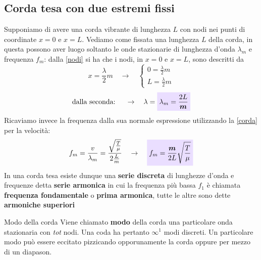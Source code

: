 \documentclass[x11names]{report}
\newcommand{\viola}[1]{\colorbox{yred}{$\displaystyle #1$}}
\begin{document}
		\subsection{Corda tesa con due estremi fissi}
		Supponiamo di avere una corda vibrante di lunghezza \(L\) con nodi nei punti di coordinate \(x=0\) e \(x=L\). Vediamo come fissata una lunghezza \(L\) della corda, in questa possono aver luogo soltanto le onde stazionarie di lunghezza d'onda \(\lambda_m\) e frequenza \(f_m\): dalla \ref{nodi} si ha che i nodi, in \(x=0\) e \(x=L\), sono descritti da
		\[ 
		x = \frac{\lambda}{2}m \quad \rightarrow \quad \begin{cases}
			0 = \frac{\lambda}{2}m\\ L = \frac{\lambda}{2}m
		\end{cases}
		\]
		\begin{equation}\label{lambdam}
			\text{dalla seconda: }\quad \to \quad \lambda = \viola{\lambda_m = \frac{2L}{\boldsymbol{m}}}
		\end{equation}
		Ricaviamo invece la frequenza dalla sua normale espressione utilizzando la \ref{corda} per la velocità:
		\[ 
		f_m = \frac{v}{\lambda_m} = \frac{\sqrt{\frac{T}{\mu}}}{2\frac{L}{m}} \quad \rightarrow \quad  \viola{f_m = \frac{\boldsymbol{m}}{2L}\sqrt{\frac{T}{\mu}}}
		\]
		In una corda tesa esiste dunque una \textbf{serie discreta} di lunghezze d'onda e frequenze detta \textbf{serie armonica} in  cui  la frequenza più bassa  \(f_1\) è chiamata \textbf{frequenza fondamentale} o \textbf{prima armonica}, tutte le altre sono dette \textbf{armoniche superiori}
		
		\begin{center}
			\colorbox{yblue}{\begin{minipage}{5.75in}
					\begin{blues}{Modo della corda}
						Viene chiamato \textbf{modo} della corda una particolare onda stazionaria con \textit{tot} nodi. Una coda ha pertanto \(\infty^1\) modi discreti. Un particolare modo può essere eccitato pizzicando opporunamente la corda oppure per mezzo di un diapason.
					\end{blues}
			\end{minipage}}
		\end{center}
		
\end{document}
